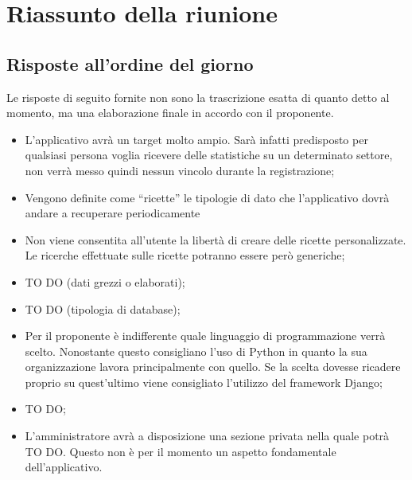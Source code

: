 %


\section{Riassunto della riunione} %
\label{sec:riassunto_della_riunione}
	\subsection{Risposte all'ordine del giorno} %
	\label{sub:risposte_all_ordine_del_giorno}
	Le risposte di seguito fornite non sono la trascrizione esatta di quanto detto al momento, ma una elaborazione finale in accordo con il proponente.
		\begin{itemize}
			\item L'applicativo avrà un target molto ampio. Sarà infatti predisposto per qualsiasi persona voglia ricevere delle statistiche su un determinato settore, non verrà messo quindi nessun vincolo durante la registrazione;
			\item Vengono definite come ``ricette'' le tipologie di dato che l'applicativo dovrà andare a recuperare periodicamente 
			\item Non viene consentita all'utente la libertà di creare delle ricette personalizzate. Le ricerche effettuate sulle ricette potranno essere però generiche;
			\item TO DO (dati grezzi o elaborati);
			\item TO DO (tipologia di database);
			\item Per il proponente è indifferente quale linguaggio di programmazione verrà scelto. Nonostante questo consigliano l'uso di Python in quanto la sua organizzazione lavora principalmente con quello. Se la scelta dovesse ricadere proprio su quest'ultimo viene consigliato l'utilizzo del framework Django; 
			\item TO DO;
			\item L'amministratore avrà a disposizione una sezione privata nella quale potrà TO DO. Questo non è per il momento un aspetto fondamentale dell'applicativo.
		\end{itemize}
	
